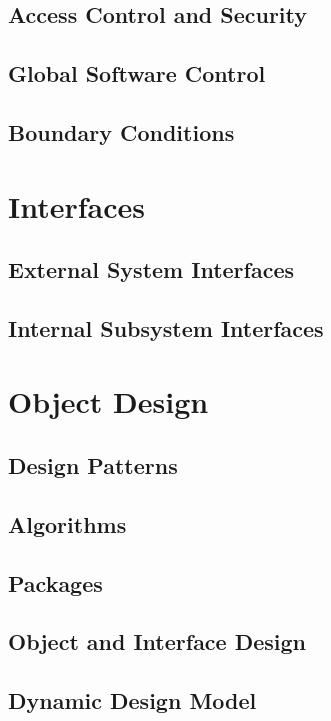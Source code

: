 \documentclass{report}
\begin{document}
\section{Access Control and Security}

\section{Global Software Control}

\section{Boundary Conditions}

\chapter{Interfaces} %
\label{ch:interfaces}

\section{External System Interfaces}

\section{Internal Subsystem Interfaces}

\chapter{Object Design} %
\label{ch:object-design}

\section{Design Patterns}

\section{Algorithms}

\section{Packages}

\section{Object and Interface Design}

\section{Dynamic Design Model}
\end{document}
